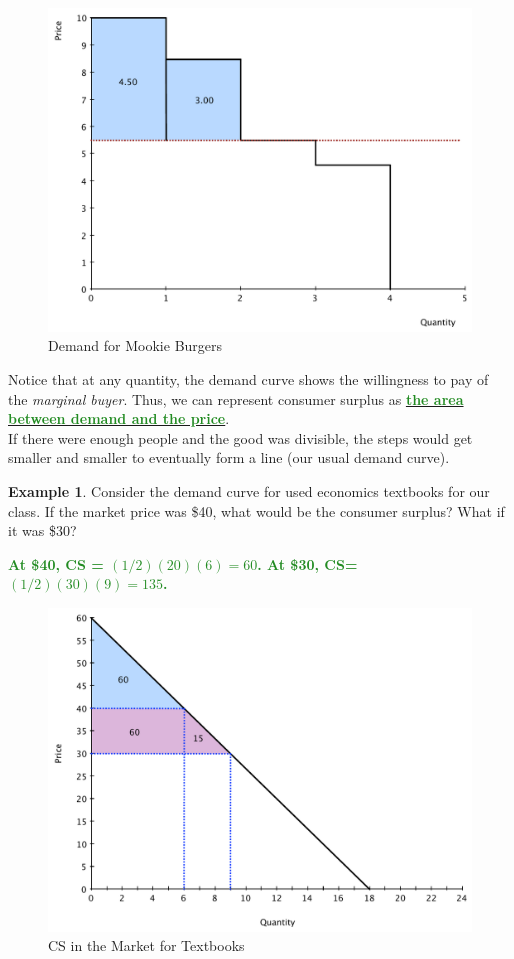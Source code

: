 \documentclass[11pt]{article}\usepackage[]{graphicx}\usepackage[]{color}
\theoremstyle{definition}
\newtheorem{exmp}{Example}[section]
\newcommand{\ddp}[1]{{\textbf{\textcolor{ForestGreen}{#1}}}}
\newcommand{\dd}[1]{{\underline{\textbf{\textcolor{ForestGreen}{#1}}}}}
\begin{document}
\begin{figure}[H]
	\centering
	\includegraphics[scale=.35]{plot18.pdf}
	\caption{Demand for Mookie Burgers}
\end{figure}

	Notice that at any quantity, the demand curve shows the willingness to pay of the \textit{marginal buyer}. Thus, we can represent consumer surplus as \dd{the area between demand and the price}.
	\\
	
	If there were enough people and the good was divisible, the steps would get smaller and smaller to eventually form a line (our usual demand curve).
	
	
	\begin{exmp} Consider the demand curve for used economics textbooks for our class. If the market price was \$40, what would be the consumer surplus? What if it was \$30?
	\end{exmp}
	
	\ddp{At \$40, CS = $(1/2)(20)(6) = 60$. At \$30, CS=$(1/2)(30)(9) = 135$.}

\begin{figure}[H]
	\centering
	\includegraphics[scale=.35]{plot19.pdf}
	\caption{CS in the Market for Textbooks}
\end{figure}
\end{document}
